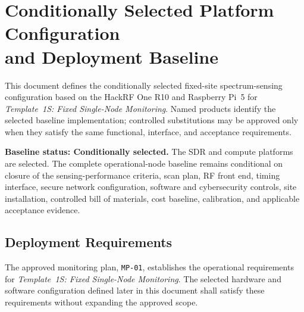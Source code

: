 \documentclass[11pt,a4paper]{article}
\begin{document}
	
	\section*{Conditionally Selected Platform Configuration\texorpdfstring{\\}{ }and Deployment Baseline}
	
	This document defines the conditionally selected fixed-site spectrum-sensing
	configuration based on the HackRF One R10 and Raspberry Pi~5 for
	\emph{Template~1S: Fixed Single-Node Monitoring}. Named products identify the
	selected baseline implementation; controlled substitutions may be approved
	only when they satisfy the same functional, interface, and acceptance
	requirements.
	
	\textbf{Baseline status: Conditionally selected.} The SDR and compute
	platforms are selected. The complete operational-node baseline remains
	conditional on closure of the sensing-performance criteria, scan plan, RF
	front end, timing interface, secure network configuration, software and
	cybersecurity controls, site installation, controlled bill of materials,
	cost baseline, calibration, and applicable acceptance evidence.
	
	\subsection*{Deployment Requirements}
	
	The approved monitoring plan, \texttt{MP-01}, establishes the operational
	requirements for \emph{Template~1S: Fixed Single-Node Monitoring}. The selected
	hardware and software configuration defined later in this document shall
	satisfy these requirements without expanding the approved scope.
	
\end{document}
